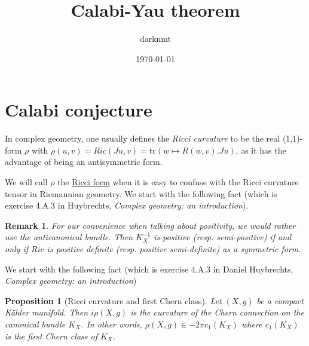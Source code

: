 \documentclass[11pt]{article}
\author{darknmt}
\date{\today}
\title{Calabi-Yau theorem}
\newtheorem{remark}{Remark}
\newtheorem{proposition}{Proposition}[theorem]
\begin{document}
\maketitle
\tableofcontents

\iffalse
\begin{info}
The PDF version of this page can be downloaded by replacing \texttt{html} in the its address by
\texttt{pdf}. 
For example \texttt{/html/sheaf-cohomology.html} should become \texttt{/pdf/sheaf-cohomology.pdf}.
\end{info}
\fi

\iffalse
\begin{info}
This post is a part of the \href{../res/Stage2017.pdf}{memoire of my M1 internship} at I2M. The memoire contains,
needless to say, less errors than this page.
\end{info}
\fi

\section{Calabi conjecture}
\label{sec:org0cb0938}

In complex geometry, one usually defines the \emph{Ricci curvature} to be the real (1,1)-form \(\rho\)
with \(\rho(u,v) = Ric(Ju, v) = \text{tr}(w \mapsto R(w,v).Ju)\), as it has the advantage of being an
antisymmetric form.

We will call \(\rho\) the \uline{Ricci form} when it is easy to confuse with the Ricci
curvature tensor in Riemannian geometry. We start with the following fact (which is exercise 4.A.3
in Huybrechts, \emph{Complex geometry: an introduction}).

\begin{remark}
For our convenience when talking about positivity, we would rather use the anticanonical
bundle. Then \(K_{X}^{-1}\) is positive (resp. semi-positive) if and only if \(Ric\) is positive
definite (resp. positive semi-definite) as a symmetric form.
\end{remark}



We start with the following fact (which is exercise 4.A.3 in Daniel Huybrechts, \emph{Complex geometry: an introduction})

\begin{proposition}[Ricci curvature and first Chern class]
Let \((X,g)\) be a compact Kähler manifold. Then \(i\rho(X,g)\) is the curvature of the Chern connection
on the canonical bundle \(K_X\). In other words, \(\rho(X,g)\in -2\pi c_1(K_X)\) where
\(c_1(K_X)\) is the first Chern class of \(K_X\).
\end{proposition}
\end{document}

